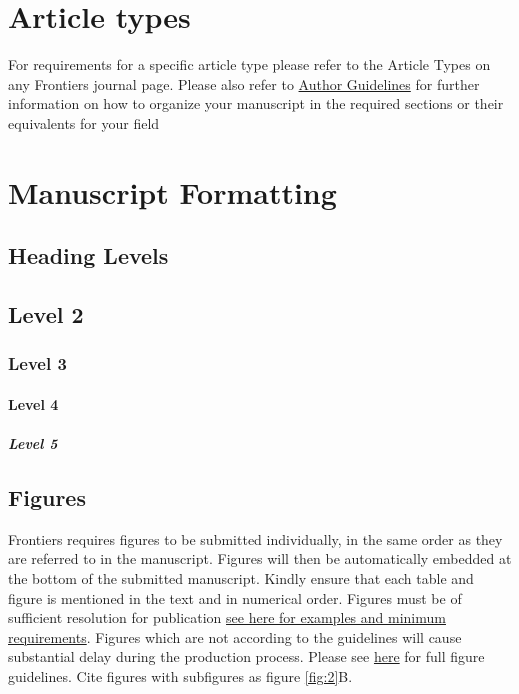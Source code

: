 \documentclass[utf8]{frontiersSCNS} %
\begin{document}
\section{Article types}

For requirements for a specific article type please refer to the Article Types on any Frontiers journal page. Please also refer to  \href{http://home.frontiersin.org/about/author-guidelines#Sections}{Author Guidelines} for further information on how to organize your manuscript in the required sections or their equivalents for your field


\section{Manuscript Formatting}

\subsection{Heading Levels}


\subsection{Level 2}
\subsubsection{Level 3}
\paragraph{Level 4}
\subparagraph{Level 5}


\subsection{Figures}
Frontiers requires figures to be submitted individually, in the same order as they are referred to in the manuscript. Figures will then be automatically embedded at the bottom of the submitted manuscript. Kindly ensure that each table and figure is mentioned in the text and in numerical order. Figures must be of sufficient resolution for publication \href{http://home.frontiersin.org/about/author-guidelines#ResolutionRequirements}{see here for examples and minimum requirements}. Figures which are not according to the guidelines will cause substantial delay during the production process. Please see \href{http://home.frontiersin.org/about/author-guidelines#GeneralStyleGuidelinesforFigures}{here} for full figure guidelines. Cite figures with subfigures as figure \ref{fig:2}B.
\end{document}

